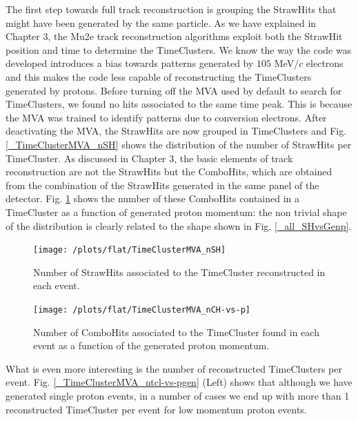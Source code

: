 \documentclass[12pt,a4paper,openright, oneside, titlepage]{book} %
\begin{document}
\noindent The first step towards full track reconstruction is grouping the StrawHits
that might have been generated by the same particle. 
As we have explained in Chapter 3, the Mu2e
track reconstruction algorithms exploit both the StrawHit position and time
to determine the TimeClusters. 
We know the way the code was developed introduces a bias towards patterns generated by 
$105$ MeV$/c$ electrons 
and this makes the code less capable of reconstructing the TimeClusters generated by protons. 
Before turning off the MVA used by default to search for TimeClusters, we found no hits associated to the same time peak. 
This is because the MVA was trained to identify patterns due to conversion electrons. 
After deactivating the MVA, the StrawHits are now grouped in TimeClusters and Fig. \ref{_TimeClusterMVA_nSH} 
shows the distribution of the number of StrawHits per TimeCluster. 
As discussed in Chapter 3, 
the basic elements of track reconstruction are not the StrawHits but the ComboHits, 
which are obtained from the combination of the StrawHits generated in the same panel of the detector. 
Fig. \ref{_flat_TimeClusterMVA_nCH-vs-p} shows the number of these ComboHits contained in a TimeCluster 
as a function of generated proton momentum: 
the non trivial shape of the distribution is clearly related to the shape shown in Fig. \ref{_all_SHvsGenp}. \\

\begin{figure}[!htb]
    \centering
    \begin{minipage}{.49\textwidth}
		\centering
		\texttt{[image: /plots/flat/TimeClusterMVA\_nSH]}
		\caption[Number of StrawHits associated to a TimeCluster]
		{Number of StrawHits associated to the TimeCluster reconstructed in each event.}
\label{_TimeClusterMVA_nSH}
	\end{minipage}
	\hfill
    \begin{minipage}{0.49\textwidth}
    	\centering
    	\texttt{[image: /plots/flat/TimeClusterMVA\_nCH-vs-p]}
\caption[Number of StrawHits associated to the TimeCluster per generated momentum]{Number of ComboHits associated to the TimeCluster found in each event as a function of the generated proton momentum.}
\label{_flat_TimeClusterMVA_nCH-vs-p}
    \end{minipage}
\end{figure}
    	
\noindent What is even more interesting is the number of reconstructed TimeClusters per event.  
Fig. \ref{_TimeClusterMVA_ntcl-vs-pgen} (Left) shows that although we have generated single proton events,
in a number of cases we end up with more than 1 reconstructed TimeCluster per event for low momentum proton events.\\
\end{document}
